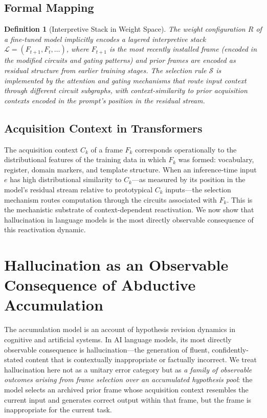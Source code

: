 \documentclass[12pt]{article}
\newtheorem{definition}{Definition}
\begin{document}
\subsection{Formal Mapping}

\begin{definition}[Interpretive Stack in Weight Space]
The weight configuration $R$ of a fine-tuned model implicitly
encodes a layered interpretive stack
$\mathcal{L} = (F_{t+1}, F_t, \ldots)$,
where $F_{t+1}$ is the most recently installed frame
(encoded in the modified circuits and gating patterns)
and prior frames are encoded as residual structure from earlier
training stages.
The selection rule $\mathcal{S}$ is implemented by the attention
and gating mechanisms that route input context through different
circuit subgraphs, with context-similarity to prior acquisition
contexts encoded in the prompt's position in the residual stream.
\end{definition}

\subsection{Acquisition Context in Transformers}

The acquisition context $C_k$ of a frame $F_k$ corresponds
operationally to the distributional features of the training data
in which $F_k$ was formed: vocabulary, register, domain markers,
and template structure.
When an inference-time input $e$ has high distributional similarity
to $C_k$---as measured by its position in the model's residual stream
relative to prototypical $C_k$ inputs---the selection mechanism
routes computation through the circuits associated with $F_k$.
This is the mechanistic substrate of context-dependent reactivation.
We now show that hallucination in language models is the most
directly observable consequence of this reactivation dynamic.

\section{Hallucination as an Observable Consequence of Abductive Accumulation}
\label{sec:hallucination}

The accumulation model is an account of hypothesis revision dynamics
in cognitive and artificial systems.
In AI language models, its most directly observable consequence is
hallucination---the generation of fluent, confidently-stated content
that is contextually inappropriate or factually incorrect.
We treat hallucination here not as a unitary error category but as
\emph{a family of observable outcomes arising from frame selection over
an accumulated hypothesis pool}: the model selects an archived prior
frame whose acquisition context resembles the current input and
generates correct output within that frame, but the frame is
inappropriate for the current task.
\end{document}
